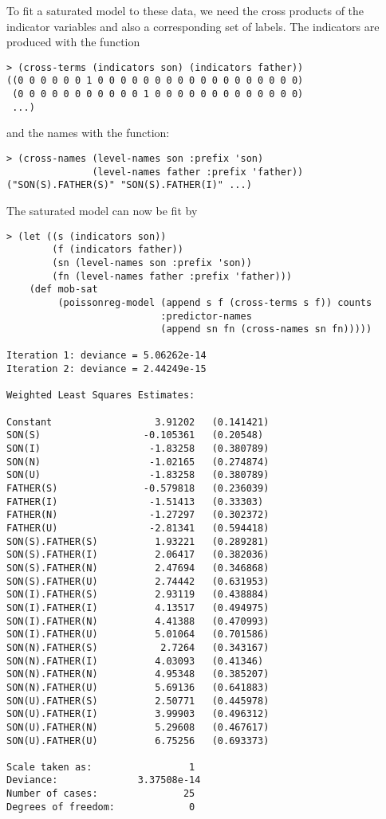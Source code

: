 To fit a saturated model to these data, we need the cross products of
the indicator variables and also a corresponding set of labels. The
indicators are produced with the  function
\begin{verbatim}
> (cross-terms (indicators son) (indicators father))
((0 0 0 0 0 0 1 0 0 0 0 0 0 0 0 0 0 0 0 0 0 0 0 0 0)
 (0 0 0 0 0 0 0 0 0 0 0 1 0 0 0 0 0 0 0 0 0 0 0 0 0)
 ...)
\end{verbatim}
and the names with the  function:
\begin{verbatim}
> (cross-names (level-names son :prefix 'son)
               (level-names father :prefix 'father))
("SON(S).FATHER(S)" "SON(S).FATHER(I)" ...)
\end{verbatim}
The saturated model can now be fit by
\begin{verbatim}
> (let ((s (indicators son))
        (f (indicators father))
        (sn (level-names son :prefix 'son))
        (fn (level-names father :prefix 'father)))
    (def mob-sat
         (poissonreg-model (append s f (cross-terms s f)) counts 
                           :predictor-names
                           (append sn fn (cross-names sn fn)))))

Iteration 1: deviance = 5.06262e-14
Iteration 2: deviance = 2.44249e-15

Weighted Least Squares Estimates:

Constant                  3.91202   (0.141421)
SON(S)                  -0.105361   (0.20548)
SON(I)                   -1.83258   (0.380789)
SON(N)                   -1.02165   (0.274874)
SON(U)                   -1.83258   (0.380789)
FATHER(S)               -0.579818   (0.236039)
FATHER(I)                -1.51413   (0.33303)
FATHER(N)                -1.27297   (0.302372)
FATHER(U)                -2.81341   (0.594418)
SON(S).FATHER(S)          1.93221   (0.289281)
SON(S).FATHER(I)          2.06417   (0.382036)
SON(S).FATHER(N)          2.47694   (0.346868)
SON(S).FATHER(U)          2.74442   (0.631953)
SON(I).FATHER(S)          2.93119   (0.438884)
SON(I).FATHER(I)          4.13517   (0.494975)
SON(I).FATHER(N)          4.41388   (0.470993)
SON(I).FATHER(U)          5.01064   (0.701586)
SON(N).FATHER(S)           2.7264   (0.343167)
SON(N).FATHER(I)          4.03093   (0.41346)
SON(N).FATHER(N)          4.95348   (0.385207)
SON(N).FATHER(U)          5.69136   (0.641883)
SON(U).FATHER(S)          2.50771   (0.445978)
SON(U).FATHER(I)          3.99903   (0.496312)
SON(U).FATHER(N)          5.29608   (0.467617)
SON(U).FATHER(U)          6.75256   (0.693373)

Scale taken as:                 1
Deviance:              3.37508e-14
Number of cases:               25
Degrees of freedom:             0
\end{verbatim}

